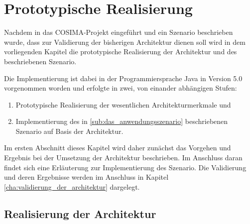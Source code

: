 
\chapter{Prototypische Realisierung} %
\label{cha:prototypische_realisierung}

  Nachdem in das COSIMA-Projekt eingeführt und ein Szenario beschrieben wurde, dass zur Validierung der bisherigen Architektur dienen soll wird in dem vorliegenden Kapitel die prototypische Realisierung der Architektur und des beschriebenen Szenario.
  
  Die Implementierung ist dabei in der Programmiersprache Java in Version 5.0 vorgenommen worden und erfolgte in zwei, von einander abhängigen Stufen:
  
  \begin{enumerate}
    \item Prototypische Realisierung der wesentlichen Architekturmerkmale und
    \item Implementierung des in \ref{sub:das_anwendungsszenario} beschriebenen Szenario auf Basis der Architektur.
  \end{enumerate}
  
  Im ersten Abschnitt dieses Kapitel wird daher zunächst das Vorgehen und Ergebnis bei der Umsetzung der Architektur beschrieben. Im Anschluss daran findet sich eine Erläuterung zur Implementierung des Szenario. Die Validierung und deren Ergebnisse werden im Anschluss in Kapitel \ref{cha:validierung_der_architektur} dargelegt.


\section{Realisierung der Architektur} %
\label{sec:realisierung_der_architektur}

